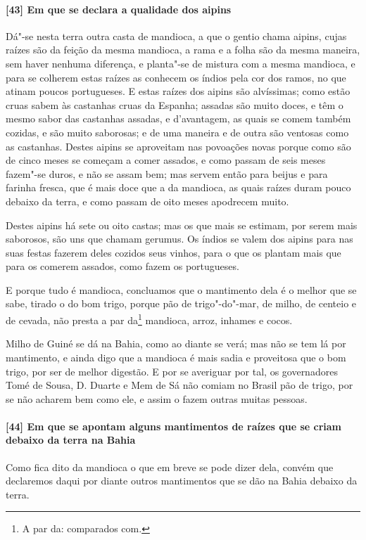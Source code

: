 \begin{linenumbers}
\paragraph{[43] Em que se declara a qualidade dos aipins}\quad
Dá"-se nesta terra outra casta de mandioca, a que o gentio chama aipins, cujas raízes são
da feição da mesma mandioca, a rama e a folha são da mesma maneira, sem haver nenhuma
diferença, e planta"-se de mistura com a mesma mandioca, e para se colherem estas raízes as
conhecem os índios pela cor dos ramos, no que atinam poucos portugueses. E estas raízes
dos aipins são alvíssimas; como estão cruas sabem às castanhas cruas da Espanha; assadas
são muito doces, e têm o mesmo sabor das castanhas assadas, e d'avantagem, as quais se
comem também cozidas, e são muito saborosas; e de uma maneira e de outra são ventosas como
as castanhas. Destes aipins se aproveitam nas povoações novas porque como são de cinco
meses se começam a comer assados, e como passam de seis meses fazem"-se duros, e não se
assam bem; mas servem então para beijus e para farinha fresca, que é mais doce que a da
mandioca, as quais raízes duram pouco debaixo da terra, e como passam de oito meses
apodrecem muito.

Destes aipins há sete ou oito castas; mas os que mais se estimam, por serem mais
saborosos, são uns que chamam gerumus. Os índios se valem dos aipins para nas suas festas
fazerem deles cozidos seus vinhos, para o que os plantam mais que para os comerem assados,
como fazem os portugueses.

E porque tudo é mandioca, concluamos que o mantimento dela é o melhor que se sabe, tirado
o do bom trigo, porque pão de trigo"-do"-mar, de milho, de centeio e de cevada, não presta a
par da\footnote{ A par da: comparados com.} mandioca, arroz, inhames e cocos.

Milho de Guiné se dá na Bahia, como ao diante se verá; mas não se tem lá por mantimento, e
ainda digo que a mandioca é mais sadia e proveitosa que o bom trigo, por ser de melhor
digestão. E por se averiguar por tal, os governadores Tomé de Sousa, D. Duarte e Mem de Sá
não comiam no Brasil pão de trigo, por se não acharem bem como ele, e assim o fazem outras
muitas pessoas.

\paragraph{[44] Em que se apontam alguns mantimentos de raízes que se criam debaixo da terra
na Bahia}\quad
Como fica dito da mandioca o que em breve se pode dizer dela, convém que declaremos daqui
por diante outros mantimentos que se dão na Bahia debaixo da terra.


\end{linenumbers}
